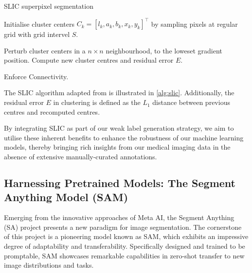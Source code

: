 \begin{algorithm}[ht]
\caption{SLIC superpixel segmentation}\label{alg:slic}
\begin{algorithmic}[1]
\item Initialise cluster centers \(C_{k} = \left[l_{k}, a_{k}, b_{k}, x_{k}, y_{k}\right]^{\top}\) by sampling pixels at regular grid with grid intervel \(S\).
\item Perturb cluster centers in a \(n \times n\) neighbourhood, to the loweset gradient position.
    \EndFor
    \State Compute new cluster centres and residual error \(E\).
\EndWhile
\item Enforce Connectivity.
\end{algorithmic}
\end{algorithm}

The SLIC algorithm adapted from \cite{achanta2010slic} is illustrated in \autoref{alg:slic}. Additionally, the residual error \(E\) in clustering is defined as the \(L_{1}\) distance between previous centres and recomputed centres.

By integrating SLIC as part of our weak label generation strategy, we aim to utilise these inherent benefits to enhance the robustness of our machine learning models, thereby bringing rich insights from our medical imaging data in the absence of extensive manually-curated annotations.

\subsection{Harnessing Pretrained Models: The Segment Anything Model (SAM)}
Emerging from the innovative approaches of Meta AI, the Segment Anything (SA) project presents a new paradigm for image segmentation. The cornerstone of this project is a pioneering model known as SAM, which exhibits an impressive degree of adaptability and transferability. Specifically designed and trained to be promptable, SAM showcases remarkable capabilities in zero-shot transfer to new image distributions and tasks.

